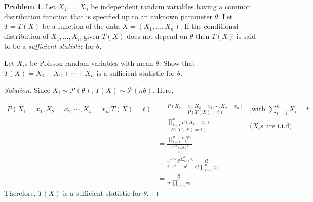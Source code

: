 \documentclass[10pt]{article}
\theoremstyle{definition}
\newtheorem{problem}{Problem}
\begin{document}
\begin{problem}
Let $X_1, \dots ,X_n$ be independent random variables having a common distribution
function that is specified up to an unknown parameter $\theta$. Let $T = T (X)$ be a function
of the data $X = (X_1, \dots , X_n)$. If the conditional distribution of $X_1, \dots, X_n$
given $T (X)$ does not depend on $\theta$ then $T (X)$ is said to be a {\it sufficient statistic} for $\theta$.

Let $X_i$s be Poisson random variables with mean $\theta$. 
Show that $T(X)=X_1+X_2+\cdots+X_n$ is a sufficient
statistic for $\theta$.
\end{problem}

\begin{proof}[Solution]
Since $X_i \sim \mathcal{P}(\theta)$, $T(X) \sim \mathcal{P}(n\theta)$. Here,

\begin{align*}
P(X_1=x_1,X_2=x_2,\cdots,X_n=x_n|T(X)=t) &= \frac{P(X_1=x_1,X_2=x_2,\cdots,X_n=x_n)}{P(T(X)=t)} &\mbox{,with $\sum_{i=1}^{n}X_i=t$}\\
&=\frac{\prod_{i=1}^{n}P(X_i=x_i)}{P(T(X)=t)} &\mbox{($X_i$s are i.i.d)}\\
&=\frac{\prod_{i=1}^{n}\frac{e^{-\theta}\theta^{x_i}}{x_i!}}{\frac{e^{-n\theta}(n\theta)^t}{t!}}\\
&= \frac{e^{-n\theta}}{e^{-n\theta}}\frac{\theta^{\sum_{i=1}^{n}x_i}}{\theta^t}\frac{t!}{n^t \prod_{i=1}^{n}x_i}\\
&=\frac{t!}{n^t \prod_{i=1}^{n}x_i}
\end{align*}
Therefore, $T(X)$ is a sufficient statistic for $\theta$.
\end{proof}
\end{document}
